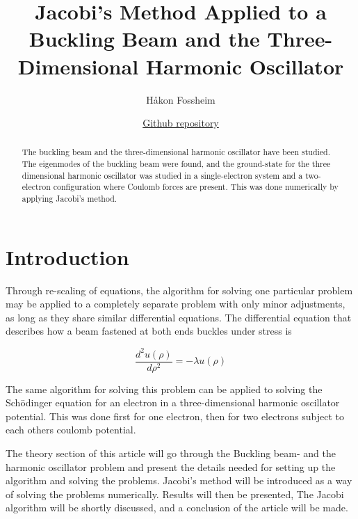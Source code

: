\documentclass[a4paper,11pt]{article}
\title{Jacobi's Method Applied to a Buckling Beam and the Three-Dimensional Harmonic Oscillator}
\author{Håkon Fossheim }
\date{\href{https://github.com/fosheimdet/Computational-Physics}{Github repository}}
\begin{document}
\maketitle



\begin{abstract}
    The buckling beam and the three-dimensional harmonic oscillator have been studied. The eigenmodes of the buckling beam were found, and the ground-state for the three dimensional harmonic oscillator was studied in a single-electron system and a two-electron configuration where Coulomb forces are present. This was done numerically by applying Jacobi's method.
\end{abstract}

\tableofcontents

\newpage
\section{Introduction}

Through re-scaling of equations, the algorithm for solving one particular problem may be applied to a completely separate problem with only minor adjustments, as long as they share similar differential equations. The differential equation that describes how a beam fastened at both ends buckles under stress is \cite{Project2}  

\begin{equation}\label{eq:1}
    \frac{d^2u(\rho)}{d\rho^2} =-\lambda u(\rho)
\end{equation}

The same algorithm for solving this problem can be  applied to solving the Schödinger equation for an electron in a three-dimensional harmonic oscillator potential. This was done first for one electron, then for two electrons subject to each others coulomb potential. 

The theory section of this article will go through the Buckling beam- and the harmonic oscillator problem and present the details needed for setting up the algorithm and solving the problems. Jacobi's method will be introduced as a way of solving the problems numerically. Results will then be presented, The Jacobi algorithm will be shortly discussed, and a conclusion of the article will be made. 
\end{document}
